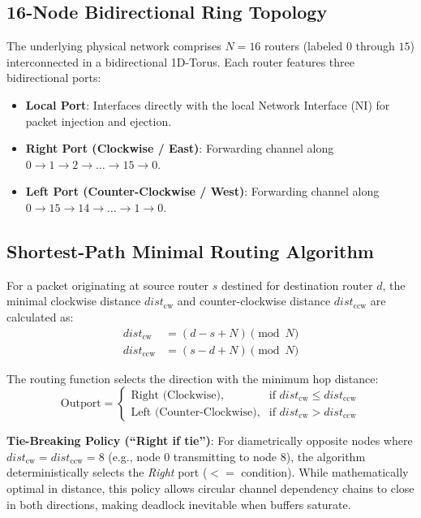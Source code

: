\documentclass[10pt,journal,compsoc]{IEEEtran}
\begin{document}
\subsection{16-Node Bidirectional Ring Topology}
The underlying physical network comprises $N=16$ routers (labeled $0$ through $15$) interconnected in a bidirectional 1D-Torus. Each router features three bidirectional ports:
\begin{itemize}
    \item \textbf{Local Port}: Interfaces directly with the local Network Interface (NI) for packet injection and ejection.
    \item \textbf{Right Port (Clockwise / East)}: Forwarding channel along $0 \to 1 \to 2 \to \dots \to 15 \to 0$.
    \item \textbf{Left Port (Counter-Clockwise / West)}: Forwarding channel along $0 \to 15 \to 14 \to \dots \to 1 \to 0$.
\end{itemize}

\subsection{Shortest-Path Minimal Routing Algorithm}
For a packet originating at source router $s$ destined for destination router $d$, the minimal clockwise distance $dist_{\text{cw}}$ and counter-clockwise distance $dist_{\text{ccw}}$ are calculated as:
\begin{align}
dist_{\text{cw}} &= (d - s + N) \pmod{N} \\
dist_{\text{ccw}} &= (s - d + N) \pmod{N}
\end{align}

The routing function selects the direction with the minimum hop distance:
\begin{equation}
\text{Outport} = \begin{cases} 
\text{Right (Clockwise)}, & \text{if } dist_{\text{cw}} \le dist_{\text{ccw}} \\
\text{Left (Counter-Clockwise)}, & \text{if } dist_{\text{cw}} > dist_{\text{ccw}}
\end{cases}
\end{equation}

\noindent \textbf{Tie-Breaking Policy (``Right if tie'')}: For diametrically opposite nodes where $dist_{\text{cw}} = dist_{\text{ccw}} = 8$ (e.g., node $0$ transmitting to node $8$), the algorithm deterministically selects the \textit{Right} port ($<=$ condition). While mathematically optimal in distance, this policy allows circular channel dependency chains to close in both directions, making deadlock inevitable when buffers saturate.
\end{document}
